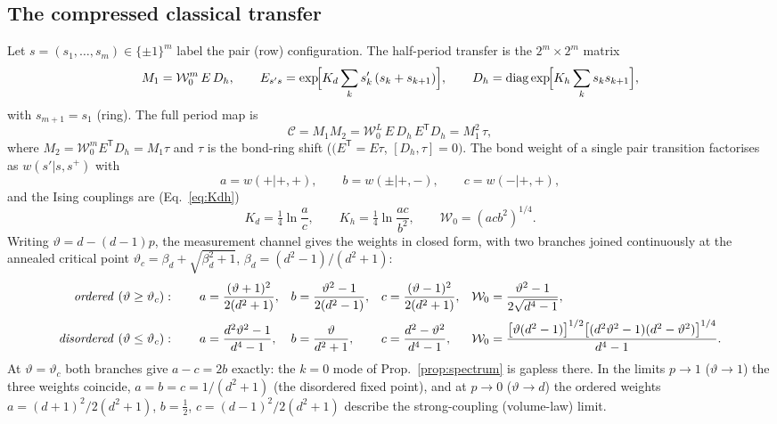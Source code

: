 \documentclass[11pt]{article}
\newcommand{\vth}{\vartheta}
\newcommand{\Ccomp}{\mathcal{C}}
\newcommand{\Wz}{\mathcal{W}_0}
\begin{document}
\subsection{The compressed classical transfer}
\label{sec:compression}

Let $s=(s_1,\dots,s_m)\in\{\pm1\}^m$ label the pair (row) configuration.
The half-period transfer is the $2^m\times2^m$ matrix
\begin{equation}
  M_1=\Wz^m\,E\,D_h,\qquad
  E_{s's}=\exp\!\Bigl[K_d\sum_k s'_k\,(s_k+s_{k+1})\Bigr],\qquad
  D_h=\operatorname{diag}\exp\!\Bigl[K_h\sum_k s_k s_{k+1}\Bigr],
  \label{eq:M1M2}
\end{equation}
with $s_{m+1}=s_1$ (ring).  The full period map is
\begin{equation}
  \Ccomp=M_1M_2=\Wz^L\,E\,D_h\,E^{\mathsf T}D_h
       =M_1^2\,\tau,
  \label{eq:periodmap}
\end{equation}
where $M_2=\Wz^mE^{\mathsf T}D_h=M_1\tau$ and $\tau$ is the bond-ring shift
($(E^{\mathsf T}=E\tau$, $[D_h,\tau]=0)$.  The bond weight of a single pair
transition factorises as $w(s'|s,s^+)$ with
\begin{equation}
  a=w(+|+,+),\qquad b=w(\pm|+,-),\qquad c=w(-|+,+),
  \label{eq:weights}
\end{equation}
and the Ising couplings are (Eq.~\ref{eq:Kdh})
\begin{equation}
  K_d=\tfrac14\ln\frac{a}{c},\qquad
  K_h=\tfrac14\ln\frac{ac}{b^2},\qquad
  \Wz=(acb^2)^{1/4}.
  \label{eq:Kdh}
\end{equation}
Writing $\vth=d-(d-1)p$, the measurement channel gives the weights in closed
form, with two branches joined continuously at the annealed critical point
$\vth_c=\beta_d+\sqrt{\beta_d^2+1}$, $\beta_d=(d^2-1)/(d^2+1)$:
\begin{align}
  \text{\emph{ordered}}\ (\vth\ge\vth_c):\qquad
  a&=\frac{(\vth+1)^2}{2(d^2+1)},& b&=\frac{\vth^2-1}{2(d^2-1)},&
  c&=\frac{(\vth-1)^2}{2(d^2+1)},&
  \Wz&=\frac{\vth^2-1}{2\sqrt{d^4-1}},
  \label{eq:wordered}\\[2pt]
  \text{\emph{disordered}}\ (\vth\le\vth_c):\qquad
  a&=\frac{d^2\vth^2-1}{d^4-1},& b&=\frac{\vth}{d^2+1},&
  c&=\frac{d^2-\vth^2}{d^4-1},&
  \Wz&=\frac{\bigl[\vth(d^2-1)\bigr]^{1/2}
        \bigl[(d^2\vth^2-1)(d^2-\vth^2)\bigr]^{1/4}}{d^4-1}.
  \label{eq:wdisordered}
\end{align}
At $\vth=\vth_c$ both branches give $a-c=2b$ exactly: the $k=0$ mode of
Prop.~\ref{prop:spectrum} is gapless there.  In the limits $p\to1$
($\vth\to1$) the three weights coincide, $a=b=c=1/(d^2+1)$ (the disordered
fixed point), and at $p\to0$ ($\vth\to d$) the ordered weights
$a=(d+1)^2/2(d^2+1)$, $b=\tfrac12$, $c=(d-1)^2/2(d^2+1)$ describe the
strong-coupling (volume-law) limit.
\end{document}
